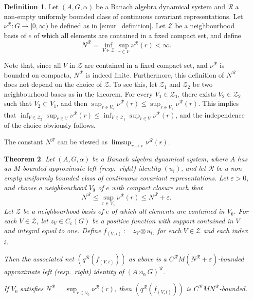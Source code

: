 \documentclass{amsart}
\theoremstyle{plain}
\newtheorem{theorem}{Theorem}[section]
\theoremstyle{definition}
\newtheorem{defn}[theorem]{Definition}
\numberwithin{equation}{section}
\begin{document}
\begin{defn}\label{d:Nr_definition}
Let ${(A,G,\alpha)}$ be a Banach algebra dynamical system and $\mathcal{R}$ a non-empty uniformly bounded class of continuous covariant representations. Let ${\nu^{\mathcal R}}:G\to [0,\infty)$ be defined as in \eqref{e:nur_definition}.
Let $\mathcal{Z}$ be a neighbourhood basis of $e$ of which all elements are contained in a fixed compact set, and define
\begin{equation}\label{e:Nr_definition}
{N^{\mathcal R}}= \inf_{V \in \mathcal{Z}} \sup_{r \in V} {\nu^{\mathcal R}}(r)<\infty.
\end{equation}
\end{defn}
Note that, since all $V$ in $\mathcal Z$ are contained in a fixed compact set, and ${\nu^{\mathcal R}}$ is bounded on compacta, ${N^{\mathcal R}}$ is indeed finite. Furthermore, this definition of ${N^{\mathcal R}}$ does not depend on the choice of $\mathcal Z$. To see this, let $\mathcal Z_1$ and $\mathcal Z_2$ be two neighbourhood bases as in the theorem. For every $V_1\in\mathcal Z_1$, there exists $V_2\in\mathcal Z_2$ such that $V_2\subset V_1$, and then $\sup_{r \in V_2} {\nu^{\mathcal R}}(r)\leq\sup_{r \in V_1} {\nu^{\mathcal R}}(r)$. This implies that $\inf_{V \in \mathcal{Z}_2} \sup_{r \in V}{\nu^{\mathcal R}}(r)\leq \inf_{V \in \mathcal{Z}_1} \sup_{r \in V} {\nu^{\mathcal R}}(r)$, and the independence of the choice obviously follows.

The constant ${N^{\mathcal R}}$ can be viewed as $\limsup_{r\to e}{\nu^{\mathcal R}}(r)$.

\begin{theorem}\label{t:crossed_product_has_bounded_approximate_identities}
Let ${(A,G,\alpha)}$ be a Banach algebra dynamical system, where $A$ has an $M$-bounded approximate left \textup{(}resp.\ right\textup{)} identity $(u_i)$, and let $\mathcal{R}$ be a non-empty uniformly bounded class of continuous covariant representations. Let ${\varepsilon} > 0$, and choose a neighbourhood $V_0$ of $e$ with compact closure such that
\[
{N^{\mathcal R}} \leq \sup_{r \in V_0} {\nu^{\mathcal R}}(r) \leq {N^{\mathcal R}} + {\varepsilon}.
\]
Let $\mathcal{Z}$ be a neighbourhood basis of $e$ of which all elements are contained in $V_0$. For each $V \in \mathcal{Z}$, let $z_V \in C_c(G)$ be a positive function with support contained in $V$ and integral equal to one. Define $f_{(V,i)} := z_V \otimes u_i$, for each $V\in\mathcal Z$ and each index $i$.

Then the associated net $\left({q^{\mathcal R}}(f_{(V,i)})\right)$ as above is a ${{C^{\mathcal R}}} M({N^{\mathcal R}}+{\varepsilon})$-bounded approximate left \textup{(}resp.\ right\textup{)} identity of ${(A {\rtimes}_\alpha G)^\mathcal{R}}$.

If $V_0$ satisfies $N^{\mathcal R} = \sup_{r \in V_0} {\nu^{\mathcal R}}(r)$, then $\left({q^{\mathcal R}}(f_{(V,i)})\right)$ is ${{C^{\mathcal R}}} M {N^{\mathcal R}}$-bounded.
\end{theorem}
\end{document}
